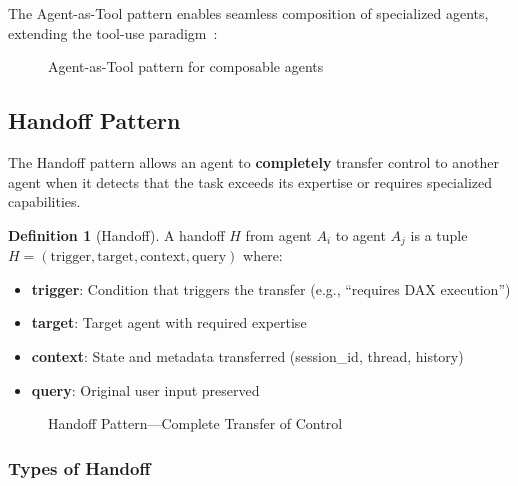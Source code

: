 \documentclass[11pt,a4paper]{article}
\theoremstyle{definition}
\newtheorem{definition}{Definition}[section]
\theoremstyle{remark}
\begin{document}
The Agent-as-Tool pattern enables seamless composition of specialized agents, extending the tool-use paradigm~\cite{schick2024toolformer,patil2023gorilla}:

\begin{figure}[H]
    \centering
    
    \caption{Agent-as-Tool pattern for composable agents}
    \label{fig:agent-as-tool}
\end{figure}

\subsection{Handoff Pattern}

The Handoff pattern allows an agent to \textbf{completely} transfer control to another agent when it detects that the task exceeds its expertise or requires specialized capabilities.

\begin{definition}[Handoff]
A handoff $H$ from agent $A_i$ to agent $A_j$ is a tuple $H = (\text{trigger}, \text{target}, \text{context}, \text{query})$ where:
\begin{itemize}
    \item \textbf{trigger}: Condition that triggers the transfer (e.g., ``requires DAX execution'')
    \item \textbf{target}: Target agent with required expertise
    \item \textbf{context}: State and metadata transferred (session\_id, thread, history)
    \item \textbf{query}: Original user input preserved
\end{itemize}
\end{definition}

\begin{figure}[H]
    \centering
    
    \caption{Handoff Pattern---Complete Transfer of Control}
    \label{fig:handoff-pattern}
\end{figure}

\subsubsection{Types of Handoff}
\end{document}
